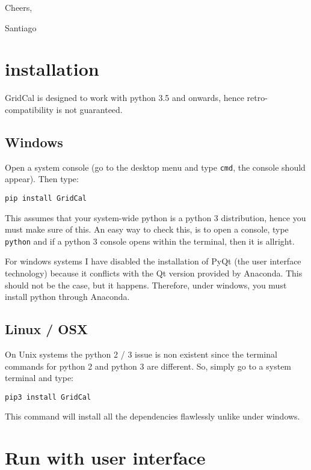 \documentclass[11pt,fleqn]{book} %
\begin{document}
\begin{flushright}
	Cheers, 

Santiago
\end{flushright}

\newpage
\section{installation}


GridCal is designed to work with python 3.5 and onwards, hence retro-compatibility is not guaranteed.

\subsection{Windows}

Open a system console (go to the desktop menu and type \verb|cmd|, the console should appear). Then type:\newline

\verb|pip install GridCal| \newline

This assumes that your system-wide python is a python 3 distribution, hence you must make sure of this. An easy way to check this, is to open a console, type \verb|python| and if a python 3 console opens within the terminal, then it is allright.

For windows systems I have disabled the installation of PyQt (the user interface technology) because it conflicts with the Qt version provided by Anaconda. This should not be the case, but it happens. Therefore, under windows, you must install python through Anaconda.

\subsection{Linux / OSX}

On Unix systems the python 2 / 3 issue is non existent since the terminal commands for python 2 and python 3 are different. So, simply go to a system terminal and type:\newline

\verb|pip3 install GridCal|  \newline

This command will install all the dependencies flawlessly unlike under windows.


\section{Run with user interface}
\end{document}
